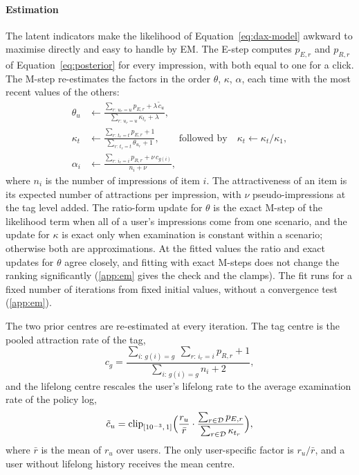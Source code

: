 \paragraph{Estimation} The latent indicators make the likelihood of Equation~\eqref{eq:dax-model} awkward to maximise directly and easy to
handle by EM. The E-step computes $p_{E,r}$ and $p_{R,r}$ of Equation~\eqref{eq:posterior} for every impression, with both equal to one for a
click. The M-step re-estimates the factors in the order $\theta$, $\kappa$, $\alpha$, each time with the most recent values of the others:
\begin{align}
  \theta_u&\leftarrow\frac{\sum_{r:\,u_r=u}p_{E,r}+\lambda\,\tilde c_u}{\sum_{r:\,u_r=u}\kappa_{t_r}+\lambda},
  \label{eq:m-theta}\\
  \kappa_t&\leftarrow\frac{\sum_{r:\,t_r=t}p_{E,r}+1}{\sum_{r:\,t_r=t}\theta_{u_r}+1},\qquad\text{followed by}\quad
  \kappa_t\leftarrow\kappa_t/\kappa_1,
  \label{eq:m-kappa}\\
  \alpha_i&\leftarrow\frac{\sum_{r:\,i_r=i}p_{R,r}+\nu\,c_{g(i)}}{n_i+\nu},
  \label{eq:m-alpha}
\end{align}
where $n_i$ is the number of impressions of item $i$. The attractiveness of an item is its expected number of attractions per impression,
with $\nu$ pseudo-impressions at the tag level added. The ratio-form update for $\theta$ is the exact M-step of the likelihood term when all of a user's impressions come from one
scenario, and the update for $\kappa$ is exact only when examination is constant within a scenario; otherwise both are approximations.
At the fitted values the ratio and exact updates for $\theta$ agree closely, and fitting with exact M-steps does not change the ranking
significantly (\ref{app:em} gives the check and the clamps). The fit runs for a fixed number of iterations from fixed initial values, without a convergence test (\ref{app:em}).

The two prior centres are re-estimated at every iteration. The tag centre is the pooled attraction rate of the tag,
\begin{equation}
  c_g=\frac{\sum_{i:\,g(i)=g}\ \sum_{r:\,i_r=i}p_{R,r}+1}{\sum_{i:\,g(i)=g}n_i+2},
  \label{eq:tag-centre}
\end{equation}
and the lifelong centre rescales the user's lifelong rate to the average examination rate of the policy log,
\begin{equation}
  \tilde c_u=\operatorname{clip}_{[10^{-3},\,1]}\Bigl(\frac{r_u}{\bar r}\cdot\frac{\sum_{r\in\mathcal D}p_{E,r}}{\sum_{r\in\mathcal D}\kappa_{t_r}}\Bigr),
  \label{eq:life-centre}
\end{equation}
where $\bar r$ is the mean of $r_u$ over users. The only user-specific factor is $r_u/\bar r$, and a user without lifelong history receives the
mean centre.

